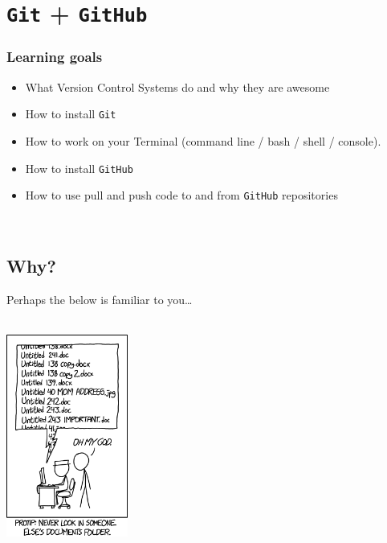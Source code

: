 \documentclass[]{book}
\providecommand{\tightlist}{%
  \setlength{\itemsep}{0pt}\setlength{\parskip}{0pt}}
\begin{document}
\hypertarget{git-github}{%
\chapter{\texorpdfstring{\texttt{Git} + \texttt{GitHub}}{Git + GitHub}}\label{git-github}}

\hypertarget{learning-goals-13}{%
\subsection*{Learning goals}\label{learning-goals-13}}

\begin{itemize}
\tightlist
\item
  What Version Control Systems do and why they are awesome\\
\item
  How to install \texttt{Git}
\item
  How to work on your Terminal (command line / bash / shell / console).\\
\item
  How to install \texttt{GitHub}\\
\item
  How to use pull and push code to and from \texttt{GitHub} repositories
\end{itemize}

~

\hypertarget{why}{%
\section*{Why?}\label{why}}

Perhaps the below is familiar to you\ldots{}

~\\

\includegraphics[width=0.3\textwidth,height=\textheight]{img/version_control.png}
\end{document}
